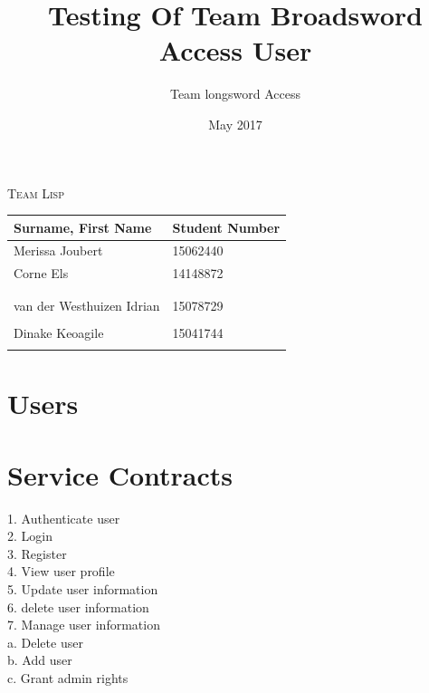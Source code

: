 \documentclass[english]{article}
\begin{document}
\title{Testing Of Team Broadsword Access User }
\author{Team longsword Access }
\date{May 2017}
\maketitle
\begin{center}
{\scshape\Large Team Lisp \par}
\vspace{0.9cm}
	\begin{tabu} to \textwidth { X[l] X[l]}
		\hline
		\textbf{Surname, First Name  }	& \textbf{Student Number}	\\ \hline \hline
		   Merissa Joubert &15062440	\\ \hline
		  Corne Els &14148872	\\ \hline
		  &	\\ \hline
	    	 &	\\ \hline
		van der Westhuizen Idrian&15078729\\ \hline
		 &	\\ \hline
		 Dinake Keoagile&15041744\\ \hline
		 &	\\ \hline
		\hline
	\end{tabu}

	\end{center}

	\newpage
	\tableofcontents

	\newpage

\section{Users}

\section{Service Contracts}
1.	Authenticate user\\
2.	Login\\
3.	Register\\
4.	View user profile\\
5.	Update user information\\
6.	delete user information\\
7.	Manage user information\\
    a.	Delete user\\
    b.	Add user\\
    c.	Grant admin rights\\
\end{document}
